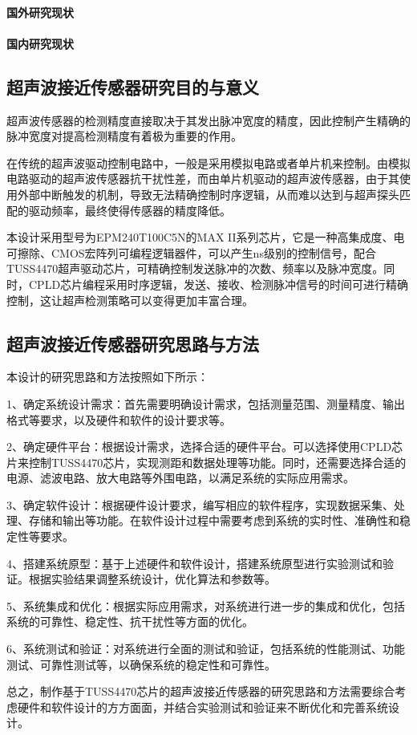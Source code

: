     \paragraph{国外研究现状}
    \paragraph{国内研究现状}
    
    \subsection{超声波接近传感器研究目的与意义}
    超声波传感器的检测精度直接取决于其发出脉冲宽度的精度，因此控制产生精确的脉冲宽度对提高检测精度有着极为重要的作用。\par
    在传统的超声波驱动控制电路中，一般是采用模拟电路或者单片机来控制。由模拟电路驱动的超声波传感器抗干扰性差，而由单片机驱动的超声波传感器，由于其使用外部中断触发的机制，导致无法精确控制时序逻辑，从而难以达到与超声探头匹配的驱动频率，最终使得传感器的精度降低。\par
    本设计采用型号为EPM240T100C5N的MAX II系列芯片，它是一种高集成度、电可擦除、CMOS宏阵列可编程逻辑器件，可以产生ns级别的控制信号，配合TUSS4470超声驱动芯片，可精确控制发送脉冲的次数、频率以及脉冲宽度。同时，CPLD芯片编程采用时序逻辑，发送、接收、检测脉冲信号的时间可进行精确控制，这让超声检测策略可以变得更加丰富合理。
    
    \subsection{超声波接近传感器研究思路与方法}
    本设计的研究思路和方法按照如下所示：\par
   1、确定系统设计需求：首先需要明确设计需求，包括测量范围、测量精度、输出格式等要求，以及硬件和软件的设计要求等。

2、确定硬件平台：根据设计需求，选择合适的硬件平台。可以选择使用CPLD芯片来控制TUSS4470芯片，实现测距和数据处理等功能。同时，还需要选择合适的电源、滤波电路、放大电路等外围电路，以满足系统的实际应用需求。

3、确定软件设计：根据硬件设计要求，编写相应的软件程序，实现数据采集、处理、存储和输出等功能。在软件设计过程中需要考虑到系统的实时性、准确性和稳定性等要求。

4、搭建系统原型：基于上述硬件和软件设计，搭建系统原型进行实验测试和验证。根据实验结果调整系统设计，优化算法和参数等。

5、系统集成和优化：根据实际应用需求，对系统进行进一步的集成和优化，包括系统的可靠性、稳定性、抗干扰性等方面的优化。

6、系统测试和验证：对系统进行全面的测试和验证，包括系统的性能测试、功能测试、可靠性测试等，以确保系统的稳定性和可靠性。\par

总之，制作基于TUSS4470芯片的超声波接近传感器的研究思路和方法需要综合考虑硬件和软件设计的方方面面，并结合实验测试和验证来不断优化和完善系统设计。